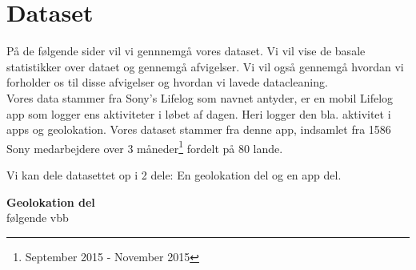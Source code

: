 \section{Dataset}
På de følgende sider vil vi gennnemgå vores dataset. Vi vil vise de basale statistikker over dataet og gennemgå afvigelser. Vi vil også gennemgå hvordan vi forholder os til disse afvigelser og hvordan vi lavede datacleaning. \\

Vores data stammer fra Sony's Lifelog\cite{sonyLifeLog} som navnet antyder, er en mobil Lifelog app som logger ens aktiviteter i løbet af dagen. Heri logger den bla. aktivitet i apps og geolokation. Vores dataset stammer fra denne app, indsamlet fra 1586 Sony medarbejdere over 3 måneder\footnote{September 2015 - November 2015} fordelt på 80 lande. 

Vi kan dele datasettet op i 2 dele: En geolokation del og en app del. 

\textbf{Geolokation del}\\
følgende
vbb

